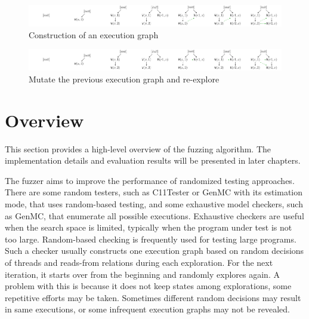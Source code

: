 \begin{figure}[htbp] 
    \centering
    \includegraphics[scale=0.5]{figure/exec-graph/example_construct.pdf} 
    \caption{Construction of an execution graph} 
    \label{example_construct} 
\end{figure}

\begin{figure}[htbp] 
    \centering
    \includegraphics[scale=0.5]{figure/exec-graph//example_mutate.pdf} 
    \caption{Mutate the previous execution graph and re-explore} 
    \label{example_mutate} 
\end{figure}


\section{Overview}



This section provides a high-level overview of the fuzzing algorithm. The implementation details and evaluation results will be presented in later chapters.

The fuzzer aims to improve the performance of randomized testing approaches. There are some random testers, such as C11Tester or GenMC with its estimation mode, that uses random-based testing, and some exhaustive model checkers, such as GenMC, that enumerate all possible executions. Exhaustive checkers are useful when the search space is limited, typically when the program under test is not too large. Random-based checking is frequently used for testing large programs. Such a checker usually constructs one execution graph based on random decisions of threads and reads-from relations during each exploration. For the next iteration, it starts over from the beginning and randomly explores again. A problem with this is because it does not keep states among explorations, some repetitive efforts may be taken. Sometimes different random decisions may result in same executions, or some infrequent execution graphs may not be revealed. 




